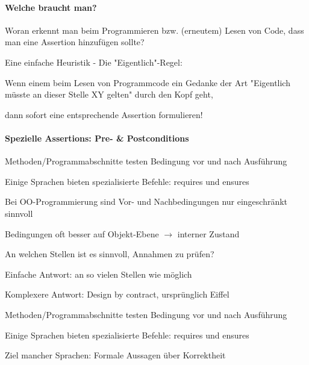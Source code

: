 \documentclass[10pt]{article}
\begin{document}
\paragraph{Welche braucht man?}
\begin{itemize*}
  \item Woran erkennt man beim Programmieren bzw. (erneutem) Lesen von Code, dass man eine Assertion hinzufügen sollte?
  \item Eine einfache Heuristik - Die "Eigentlich"-Regel:
  \begin{itemize*}
    \item Wenn einem beim Lesen von Programmcode ein Gedanke der Art "Eigentlich müsste an dieser Stelle XY gelten" durch den Kopf geht,
    \item dann sofort eine entsprechende Assertion formulieren!
  \end{itemize*}
\end{itemize*}

\paragraph{Spezielle Assertions: Pre- \& Postconditions}
\begin{itemize*}
  \item Methoden/Programmabschnitte testen Bedingung vor und nach Ausführung
  \item Einige Sprachen bieten spezialisierte Befehle: requires und ensures
  \item Bei OO-Programmierung sind Vor- und Nachbedingungen nur eingeschränkt sinnvoll
  \begin{itemize*}
    \item Bedingungen oft besser auf Objekt-Ebene $\rightarrow$ interner Zustand
  \end{itemize*}
  \item An welchen Stellen ist es sinnvoll, Annahmen zu prüfen?
  \item Einfache Antwort: an so vielen Stellen wie möglich
  \item Komplexere Antwort: Design by contract, ursprünglich Eiffel
  \item Methoden/Programmabschnitte testen Bedingung vor und nach Ausführung
  \item Einige Sprachen bieten spezialisierte Befehle: requires und ensures
  \item Ziel mancher Sprachen: Formale Aussagen über Korrektheit
\end{itemize*}
\end{document}
